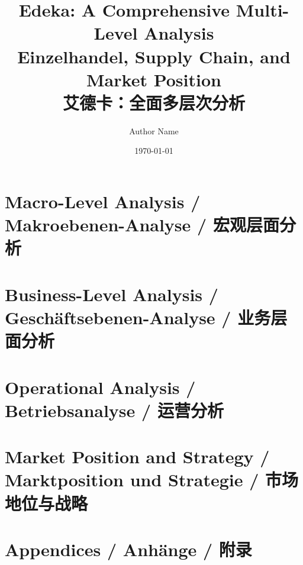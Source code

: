 \documentclass[11pt,a4paper]{book}
\title{Edeka: A Comprehensive Multi-Level Analysis\\
\large Einzelhandel, Supply Chain, and Market Position\\
\large 艾德卡：全面多层次分析}
\author{Author Name}
\date{\today}
\begin{document}
\maketitle

\frontmatter

\tableofcontents
\listoffigures
\listoftables

\mainmatter



\part{Macro-Level Analysis / Makroebenen-Analyse / 宏观层面分析}






\part{Business-Level Analysis / Geschäftsebenen-Analyse / 业务层面分析}






\part{Operational Analysis / Betriebsanalyse / 运营分析}






\part{Market Position and Strategy / Marktposition und Strategie / 市场地位与战略}






\appendix
\part{Appendices / Anhänge / 附录}





\backmatter



\end{document}
